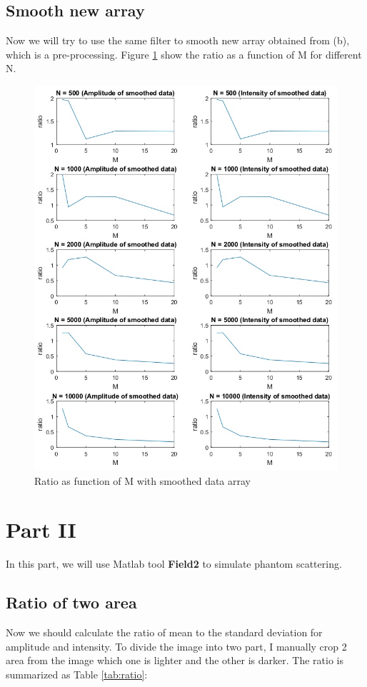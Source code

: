 \documentclass{article}
\begin{document}
\subsection{Smooth new array}
Now we will try to use the same filter to smooth new array obtained from (b), which is a pre-processing.
Figure \ref{fig:ratio_smooth_first} show the ratio as a function of M for different N.
\begin{figure}[H]
	\centering
	\includegraphics[width = \textwidth]{src/2pi/ratio_smooth_first.jpg}
	\caption{Ratio as function of M with smoothed data array}
	\label{fig:ratio_smooth_first}
\end{figure}

\section{Part \RN{2}}
In this part, we will use Matlab tool \textbf{Field2} to simulate phantom scattering.

\subsection{Ratio of two area}
Now we should calculate the ratio of mean to the standard deviation for amplitude and intensity. To divide the image into
two part, I manually crop 2 area from the image which one is lighter and the other is darker. The ratio is summarized as Table \ref{tab:ratio}:
\end{document}
